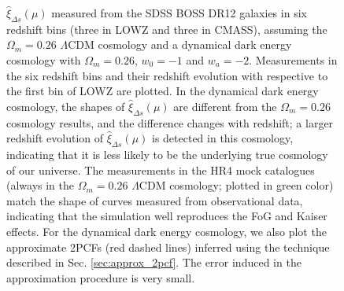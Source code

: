 \documentclass[iop]{emulateapj}
\begin{document}
\begin{figure}
   \caption{\label{fig_xi}
   $\hat\xi_{\Delta s}(\mu)$ measured from the SDSS BOSS DR12 galaxies in six redshift bins (three in LOWZ and three in CMASS),
   assuming the $\Omega_m=0.26$ $\Lambda$CDM cosmology and a dynamical dark energy cosmology with $\Omega_m=0.26$, $w_0=-1$ and $w_a=-2$.
   Measurements in the six redshift bins and their redshift evolution with respective to the first bin of LOWZ are plotted.
   In the dynamical dark energy cosmology, the shapes of $\hat\xi_{\Delta s}(\mu)$ are different from the $\Omega_m=0.26$ cosmology results,
   and the difference changes with redshift;
   a larger redshift evolution of $\hat\xi_{\Delta s}(\mu)$ is detected in this cosmology, 
   indicating that it is less likely to be the underlying true cosmology of our universe.
   The measurements in the HR4 mock catalogues (always in the $\Omega_m=0.26$ $\Lambda$CDM cosmology; plotted in green color)
   match the shape of curves measured from observational data, 
   indicating that the simulation well reproduces the FoG and Kaiser effects.
   For the dynamical dark energy cosmology, we also plot the approximate 2PCFs (red dashed lines) 
   inferred using the technique described in Sec. \ref{sec:approx_2pcf}.
   The error induced in the approximation procedure is very small.
   }
\end{figure}
\end{document}
